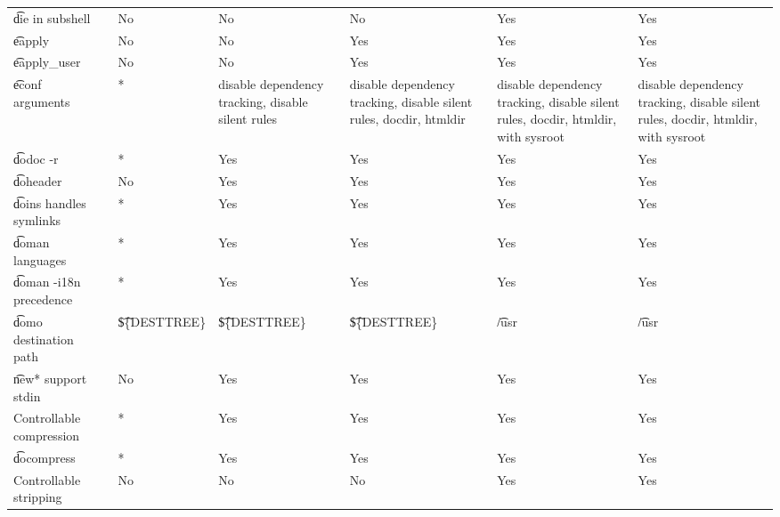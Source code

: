 \begin{landscape}
\begin{longtable}{llP{7.5em}P{7.5em}P{7.5em}P{7.5em}P{7.5em}}
\t{die} in subshell &  &
    No & No & No & Yes & Yes \\

\t{eapply} &  &
    No & No & Yes & Yes & Yes \\

\t{eapply_user} &  &
    No & No & Yes & Yes & Yes \\

\t{econf} arguments &  &
    * &
    disable dependency tracking, disable silent rules &
    disable dependency tracking, disable silent rules, docdir, htmldir &
    disable dependency tracking, disable silent rules, docdir, htmldir, with sysroot &
    disable dependency tracking, disable silent rules, docdir, htmldir, with sysroot \\

\t{dodoc -r} &  &
    * & Yes & Yes & Yes & Yes \\

\t{doheader} &  &
    No & Yes & Yes & Yes & Yes \\

\t{doins} handles symlinks &  &
    * & Yes & Yes & Yes & Yes \\

\t{doman} languages &  &
    * & Yes & Yes & Yes & Yes \\

\t{doman -i18n} precedence &  &
    * & Yes & Yes & Yes & Yes \\

\t{domo} destination path &  &
    \t{\$\{DESTTREE\}} & \t{\$\{DESTTREE\}} & \t{\$\{DESTTREE\}} & \t{/usr} & \t{/usr} \\

\t{new*} support stdin &  &
    No & Yes & Yes & Yes & Yes \\

Controllable compression &  &
    * & Yes & Yes & Yes & Yes \\

\t{docompress} &  &
    * & Yes & Yes & Yes & Yes \\

Controllable stripping &  &
    No & No & No & Yes & Yes \\


\end{longtable}
\end{landscape}
